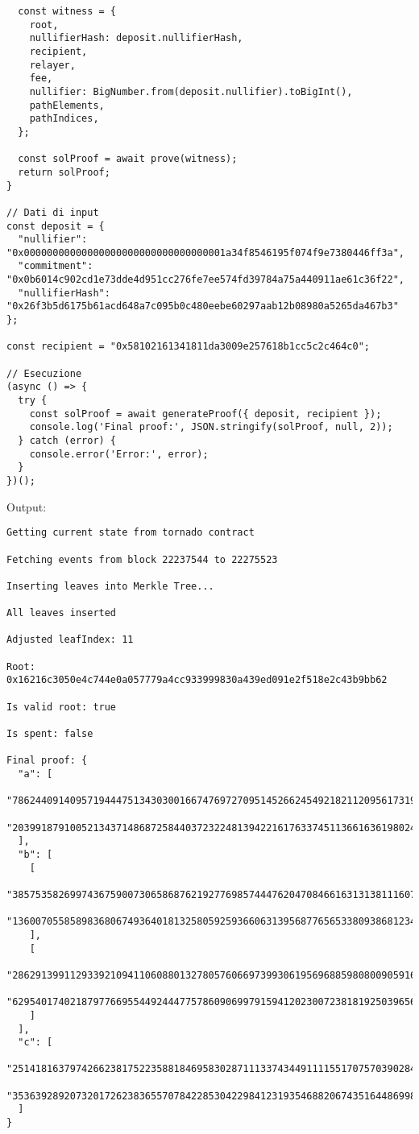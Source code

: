 \begin{lstlisting}
  const witness = {
    root,
    nullifierHash: deposit.nullifierHash,
    recipient,
    relayer,
    fee,
    nullifier: BigNumber.from(deposit.nullifier).toBigInt(),
    pathElements,
    pathIndices,
  };

  const solProof = await prove(witness);
  return solProof;
}

// Dati di input
const deposit = {
  "nullifier": "0x00000000000000000000000000000000001a34f8546195f074f9e7380446ff3a",
  "commitment": "0x0b6014c902cd1e73dde4d951cc276fe7ee574fd39784a75a440911ae61c36f22",
  "nullifierHash": "0x26f3b5d6175b61acd648a7c095b0c480eebe60297aab12b08980a5265da467b3"
};

const recipient = "0x58102161341811da3009e257618b1cc5c2c464c0";

// Esecuzione
(async () => {
  try {
    const solProof = await generateProof({ deposit, recipient });
    console.log('Final proof:', JSON.stringify(solProof, null, 2));
  } catch (error) {
    console.error('Error:', error);
  }
})();
\end{lstlisting}

Output:
\begin{verbatim}
Getting current state from tornado contract

Fetching events from block 22237544 to 22275523

Inserting leaves into Merkle Tree...

All leaves inserted

Adjusted leafIndex: 11

Root: 0x16216c3050e4c744e0a057779a4cc933999830a439ed091e2f518e2c43b9bb62

Is valid root: true

Is spent: false

Final proof: {
  "a": [
    "7862440914095719444751343030016674769727095145266245492182112095617319191350",
    "20399187910052134371486872584403723224813942216176337451136616361980246752812"
  ],
  "b": [
    [
      "385753582699743675900730658687621927769857444762047084661631313811160781351",
      "13600705585898368067493640181325805925936606313956877656533809386812346179126"
    ],
    [
      "2862913991129339210941106088013278057606697399306195696885980800905916213309",
      "6295401740218797766955449244477578609069979159412023007238181925039656728935"
    ]
  ],
  "c": [
    "2514181637974266238175223588184695830287111337434491111551707570390284323099",
    "3536392892073201726238365570784228530422984123193546882067435164486998942928"
  ]
}
\end{verbatim}
